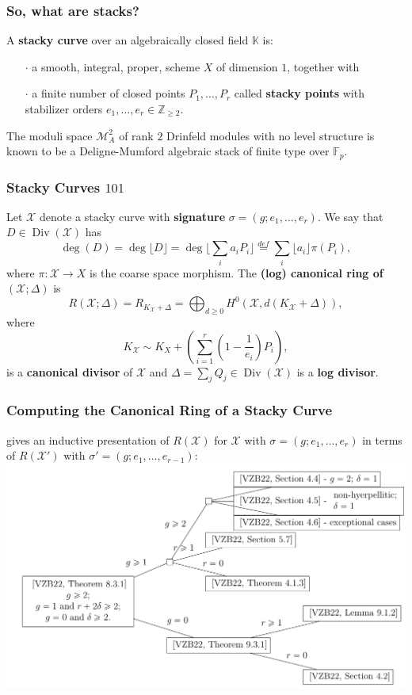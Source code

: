 \documentclass[handout]{beamer}
\numberwithin{equation}{section}
\numberwithin{case}{theorem}
\newcommand{\cM}{\mathcal{M}}		%
\newcommand{\sX}{\mathscr{X}}		%
\newcommand{\bbF}{\mathbb{F}}		%
\newcommand{\bbK}{\mathbb{K}}		%
\newcommand{\bbZ}{\mathbb{Z}}		%
\newcommand{\floor}[1]{\lfloor #1 \rfloor}
\newcommand{\<}{\left\langle}
\renewcommand{\>}{\right\rangle}
\begin{document}
	\begin{frame}
		\frametitle{So, what are stacks?}
		\begin{definition}%
			A \textbf{stacky curve} over an algebraically closed field $\bbK$ is:
			\begin{itemize}
				\item[$\cdot$] a smooth, integral, proper, scheme $X$ of dimension $1$, together with\\ \pause
				\item[$\cdot$] a finite number of closed points $P_1,\ldots, P_r$ called \textbf{stacky points} with stabilizer orders $e_1,\ldots, e_r\in \bbZ_{\geq 2}.$
			\end{itemize}
		\end{definition}
		\pause
		\begin{example}
			The moduli space $\cM^2_A$ of rank $2$ Drinfeld modules with no level structure is known to be a Deligne-Mumford algebraic stack of finite type over $\bbF_p.$ 
		\end{example}
	\end{frame}	
	
	\begin{frame}
		\frametitle{Stacky Curves $101$}		
		Let $\sX$ denote a stacky curve with \textbf{signature} $\sigma=(g;e_1,\ldots, e_r).$ \pause
		We say that $D\in \operatorname{Div}(\sX)$ has
		\[\deg(D)=\deg \lfloor D\rfloor=\deg \Big\lfloor\sum_ia_iP_i\Big\rfloor\overset{def}{=}\sum_i \floor{a_i}\pi(P_i),\]
		where $\pi:\sX\to X$ is the coarse space morphism. \pause The \textbf{(log) canonical ring of $(\sX; \Delta)$} is 
		\[R(\sX;\Delta)=R_{K_{\sX}+\Delta}=\bigoplus_{d\geq 0} H^0(\sX,d(K_{\sX}+\Delta)),\]
		where \[K_{\sX}\sim K_X+\left(\sum_{i=1}^r \left(1-\frac{1}{e_i}\right)P_i\right),\] is a \textbf{canonical divisor} of $\sX$ and $\Delta=\sum_jQ_j\in \operatorname{Div}(\sX)$ is a \textbf{log divisor}. 
	\end{frame}	
	
	\begin{frame}
		\frametitle{Computing the Canonical Ring of a Stacky Curve}
		\cite{VZB} gives an inductive presentation of $R(\sX)$ for $\sX$ with $\sigma=(g;e_1,\ldots, e_r)$ in terms of $R(\sX')$ with $\sigma'=(g;e_1,\ldots, e_{r-1})$: \pause
		\includegraphics[scale=0.5]{VZB.png}
	\end{frame}
	
\end{document}
